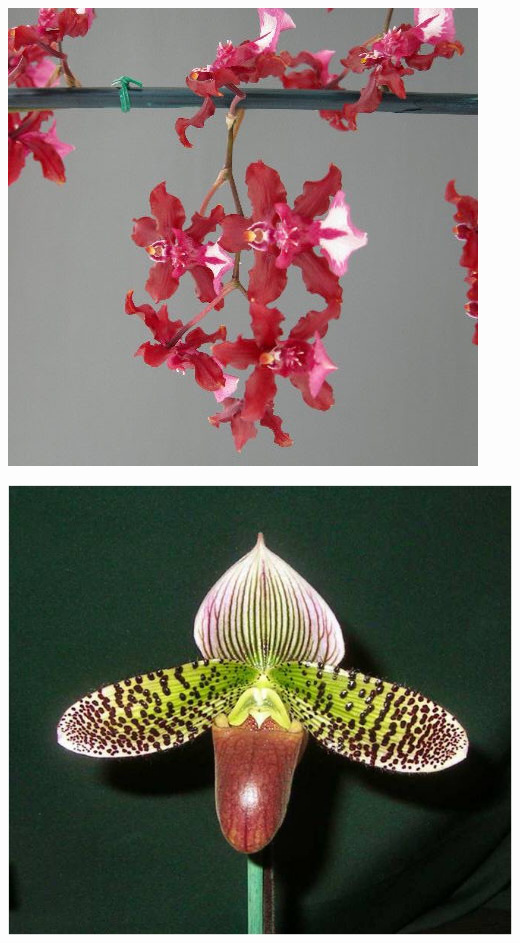 \documentclass{article}
\begin{document}
\begin{center}
\includegraphics[height=0.925\paperheight]{../Orchid_Oncidium_Red.jpg}
\end{center}
\newpage

\begin{center}
\includegraphics[height=0.925\paperheight]{../Orchid_Paphiopedilum_(Lady-Slipper).jpg}
\end{center}
\newpage
\end{document}

